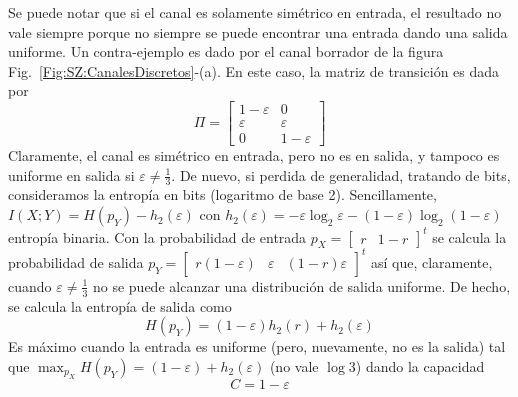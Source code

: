 {Se puede notar que si el canal es solamente sim\'etrico en entrada, el resultado
no  vale siempre  porque no  siempre se  puede encontrar  una entrada  dando una
salida uniforme.  Un contra-ejemplo es dado  por el canal borrador  de la figura
Fig.~\ref{Fig:SZ:CanalesDiscretos}-(a). En este caso,  la matriz de transici\'on
es dada por
%
\[
\Pi = \begin{bmatrix}
1 - \varepsilon & 0 \\
\varepsilon & \varepsilon \\
0 & 1 - \varepsilon
\end{bmatrix}
\]
%
Claramente, el canal es sim\'etrico en entrada,  pero no es en salida, y tampoco
es uniforme  en salida  si $\varepsilon  \ne \frac13$. De  nuevo, si  perdida de
generalidad, tratando de bits, consideramos  la entrop\'ia en bits (logaritmo de
base  2).    Sencillamente,  $I(X  ;   Y)  =  H(p_Y)  -   h_2(\varepsilon)$  con
$h_2(\varepsilon) =  - \varepsilon  \log_2 \varepsilon -  (1-\varepsilon) \log_2
(1-\varepsilon)$  entrop\'ia  binaria.   Con  la probabilidad  de  entrada  $p_X
= \begin{bmatrix} r & 1-r \end{bmatrix}^t$  se calcula la probabilidad de salida
$p_Y    =     \begin{bmatrix}    r     (1-\varepsilon)    &     \varepsilon    &
(1-r)    \varepsilon   \end{bmatrix}^t$    as\'i    que,   claramente,    cuando
$\varepsilon  \ne \frac13$  no se  puede alcanzar  una distribuci\'on  de salida
uniforme. De hecho, se calcula la entrop\'ia de salida como
%
\[
H(p_Y) = (1 - \varepsilon) h_2(r) + h_2(\varepsilon)
\]
%
Es m\'aximo  cuando la entrada es  uniforme (pero, nuevamente, no  es la salida)
tal que $\max_{p_X} H(p_Y) =  (1-\varepsilon) + h_2(\varepsilon)$ (no vale $\log
3$) dando la capacidad
%
\[
C = 1 - \varepsilon
\]


}
